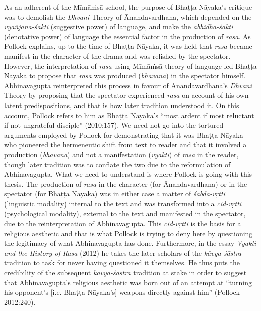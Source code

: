As an adherent of the Mīmāṁsā school, the purpose of Bhaṭṭa Nāyaka's critique was to demolish the \textsl{Dhvani} Theory of Ānandavardhana, which depended on the \textsl{vyañjanā-śakti} (suggestive power) of language, and make the \textsl{abhidhā-śakti} (denotative power) of language the essential factor in the production of \textsl{rasa}. As Pollock explains, up to the time of Bhaṭṭa Nāyaka, it was held that \textsl{rasa} became manifest in the character of the drama and was relished by the spectator. However, the interpretation of \textsl{rasa} using Mīmāṁsā theory of language led Bhaṭṭa Nāyaka to propose that \textsl{rasa} was produced (\textsl{bhāvanā}) in the spectator himself. Abhinavagupta reinterpreted this process in favour of Ānandavardhana's
 \textsl{Dhvani} Theory by proposing that the spectator experienced \textsl{rasa} on account of his own latent predispositions, and that is how later tradition understood it. On this account, Pollock refers to him as Bhaṭṭa Nāyaka's ``most ardent if most reluctant if not ungrateful disciple'' (2010:157). We need not go into the tortured arguments employed by Pollock for demonstrating that it was Bhaṭṭa Nāyaka who pioneered the hermeneutic shift from text to reader and that it involved a production (\textsl{bhāvanā}) and not a manifestation (\textsl{vyakti}) of \textsl{rasa} in the reader, though later tradition was to conflate the two due to the reformulation of Abhinavagupta. What we need to understand is where Pollock
 is going with this thesis. The production of \textsl{rasa} in the character (for Ānandavardhana) or in the spectator (for Bhaṭṭa Nāyaka) was in either case a matter of \textsl{śabda-vṛtti} (linguistic modality) internal to the text and was transformed into a \textsl{cid-vṛtti} (psychological modality), external to the text and manifested in the spectator, due to the reinterpretation of Abhinavagupta. This \textsl{cid-vṛtti} is the basis for a religious aesthetic and that is what Pollock is trying to deny here by questioning the legitimacy of what Abhinavagupta has done. Furthermore, in the essay \textsl{Vyakti and the History of Rasa} (2012) he takes the later scholars of the \textsl{kāvya-śāstra} tradition to task for never having questioned it themselves. He thus puts the credibility of the subsequent \textsl{kāvya-śāstra} tradition at stake in order to suggest that Abhinavagupta's religious aesthetic was born out of an attempt at ``turning his opponent's [i.e. Bhaṭṭa Nāyaka's] weapons directly against him'' (Pollock 2012:240).
\eject

